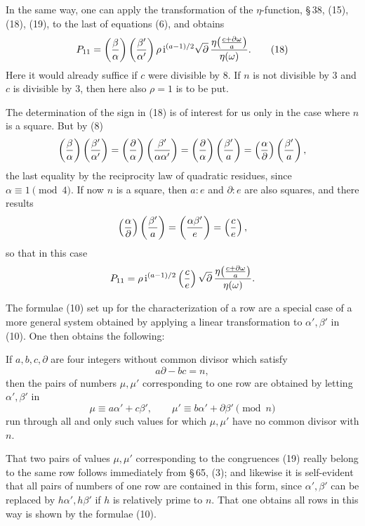 \documentclass[11pt]{article}
\providecommand{\ii}{\mathrm{i}}
\begin{document}
In the same way, one can apply the transformation of the $\eta$-function, \S\,38, (15), (18), (19), to the last of equations (6), and obtains
\begin{equation}
P_{11}=\left({\beta\over\alpha}\right)
\left({\beta'\over\alpha'}\right)
\rho\,\ii^{(a-1)/2}\sqrt{\partial}\,
{\eta\!\left({c+\partial\omega\over a}\right)\over\eta(\omega)}.
\tag{18}
\end{equation}
Here it would already suffice if $c$ were divisible by $8$. If $n$ is not divisible by $3$ and $c$ is divisible by $3$, then here also $\rho=1$ is to be put.

The determination of the sign in (18) is of interest for us only in the case where $n$ is a square. But by (8)
\[
\left({\beta\over\alpha}\right)\left({\beta'\over\alpha'}\right)
=
\left({\partial\over\alpha}\right)\left({\beta'\over \alpha\alpha'}\right)
=
\left({\partial\over\alpha}\right)\left({\beta'\over a}\right)
=
\left({\alpha\over\partial}\right)\left({\beta'\over a}\right),
\]
the last equality by the reciprocity law of quadratic residues, since $\alpha\equiv1\pmod4$. If now $n$ is a square, then $a:e$ and $\partial:e$ are also squares, and there results
\[
\left({\alpha\over\partial}\right)\left({\beta'\over a}\right)
=
\left({\alpha\beta'\over e}\right)=\left({c\over e}\right),
\]
so that in this case
\[
P_{11}=\rho\,\ii^{(a-1)/2}\left({c\over e}\right)\sqrt{\partial}\,
{\eta\!\left({c+\partial\omega\over a}\right)\over\eta(\omega)}.
\]

The formulae (10) set up for the characterization of a row are a special case of a more general system obtained by applying a linear transformation to $\alpha',\beta'$ in (10). One then obtains the following:

If $a,b,c,\partial$ are four integers without common divisor which satisfy
\[
a\partial-bc=n,
\]
then the pairs of numbers $\mu,\mu'$ corresponding to one row are obtained by letting $\alpha',\beta'$ in
\begin{equation}
\mu\equiv a\alpha'+c\beta',
\qquad
\mu'\equiv b\alpha'+\partial\beta'\pmod n
\tag{19}
\end{equation}
run through all and only such values for which $\mu,\mu'$ have no common divisor with $n$.

That two pairs of values $\mu,\mu'$ corresponding to the congruences (19) really belong to the same row follows immediately from \S\,65, (3); and likewise it is self-evident that all pairs of numbers of one row are contained in this form, since $\alpha',\beta'$ can be replaced by $h\alpha',h\beta'$ if $h$ is relatively prime to $n$. That one obtains all rows in this way is shown by the formulae (10).
\end{document}
